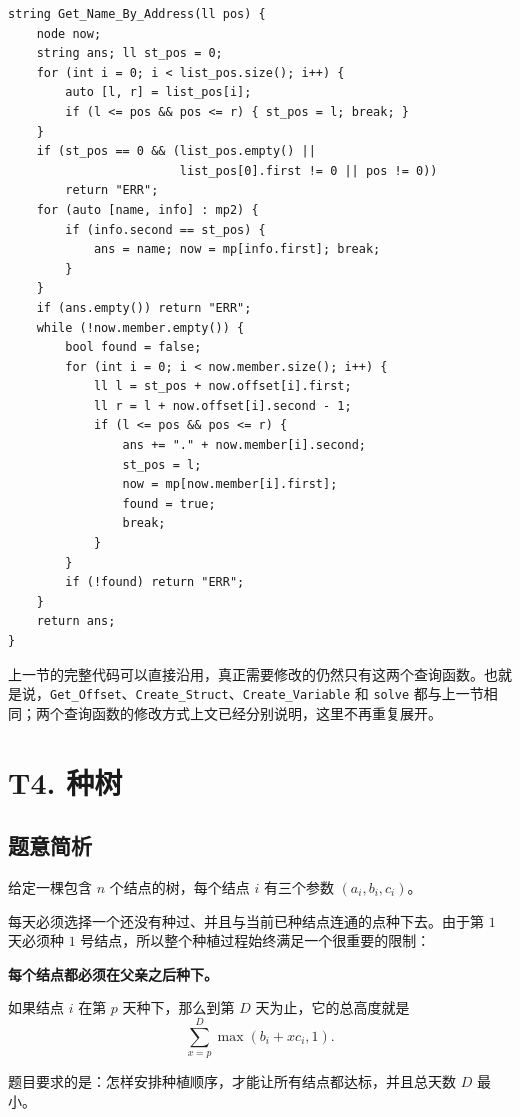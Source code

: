 \documentclass{book}
\newcommand{\code}[1]{\colorbox{codebg}{\texttt{#1}}}  %
\begin{document}
        \begin{lstlisting}[style = code]
string Get_Name_By_Address(ll pos) {
    node now;
    string ans; ll st_pos = 0;
    for (int i = 0; i < list_pos.size(); i++) {
        auto [l, r] = list_pos[i];
        if (l <= pos && pos <= r) { st_pos = l; break; }
    }
    if (st_pos == 0 && (list_pos.empty() ||
                        list_pos[0].first != 0 || pos != 0))
        return "ERR";
    for (auto [name, info] : mp2) {
        if (info.second == st_pos) {
            ans = name; now = mp[info.first]; break;
        }
    }
    if (ans.empty()) return "ERR";
    while (!now.member.empty()) {
        bool found = false;
        for (int i = 0; i < now.member.size(); i++) {
            ll l = st_pos + now.offset[i].first;
            ll r = l + now.offset[i].second - 1;
            if (l <= pos && pos <= r) {
                ans += "." + now.member[i].second;
                st_pos = l;
                now = mp[now.member[i].first];
                found = true;
                break;
            }
        }
        if (!found) return "ERR";
    }
    return ans;
}
\end{lstlisting}
    上一节的完整代码可以直接沿用，真正需要修改的仍然只有这两个查询函数。也就是说，\code{Get\_Offset}、\code{Create\_Struct}、\code{Create\_Variable} 和 \code{solve} 都与上一节相同；两个查询函数的修改方式上文已经分别说明，这里不再重复展开。


\newpage
\section{T4. 种树} %
    
    
    \subsection{题意简析}
给定一棵包含 $n$ 个结点的树，每个结点 $i$ 有三个参数 $(a_i,b_i,c_i)$。

每天必须选择一个还没有种过、并且与当前已种结点连通的点种下去。由于第 $1$ 天必须种 $1$ 号结点，所以整个种植过程始终满足一个很重要的限制：

\begin{center}
    \textbf{每个结点都必须在父亲之后种下。}
\end{center}

如果结点 $i$ 在第 $p$ 天种下，那么到第 $D$ 天为止，它的总高度就是
\[
\sum_{x=p}^{D} \max(b_i + x c_i, 1).
\]

题目要求的是：怎样安排种植顺序，才能让所有结点都达标，并且总天数 $D$ 最小。
\end{document}
